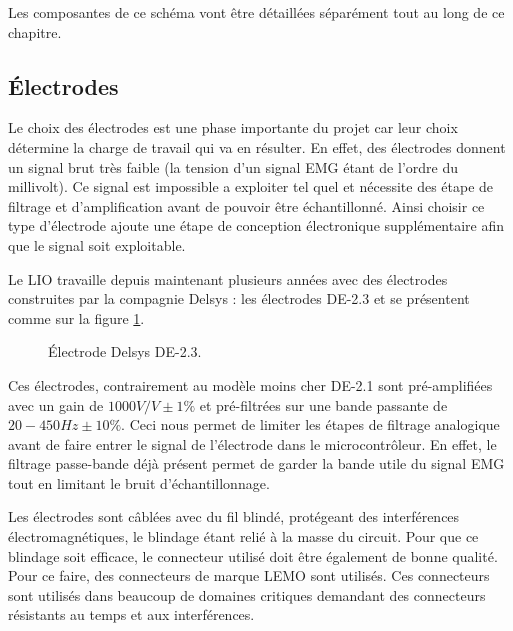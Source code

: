 \documentclass[letterpaper, twoside, 12pt, memoire, creativecommons, hyperref]{thETS}
\begin{document}
Les composantes de ce schéma vont être détaillées séparément tout au long de ce chapitre.

\subsection{Électrodes}

Le choix des électrodes est une phase importante du projet car leur choix détermine la charge de travail qui va en résulter. En effet, des électrodes donnent un signal brut très faible (la tension d'un signal EMG étant de l'ordre du millivolt). Ce signal est impossible a exploiter tel quel et nécessite des étape de filtrage et d'amplification avant de pouvoir être échantillonné. Ainsi choisir ce type d'électrode ajoute une étape de conception électronique supplémentaire afin que le signal soit exploitable.

Le LIO travaille depuis maintenant plusieurs années avec des électrodes construites par la compagnie Delsys : les électrodes DE-2.3 et se présentent comme sur la figure \ref{fig:de2.3}. 

\begin{figure}
	\centering
	\caption{Électrode Delsys DE-2.3.}
	\label{fig:de2.3}
\end{figure}

Ces électrodes, contrairement au modèle moins cher DE-2.1 sont pré-amplifiées avec un gain de $1000 V/V \pm 1\%$ et pré-filtrées sur une bande passante de $20-450 Hz \pm 10\%$. Ceci nous permet de limiter les étapes de filtrage analogique avant de faire entrer le signal de l'électrode dans le microcontrôleur. En effet, le filtrage passe-bande déjà présent permet de garder la bande utile du signal EMG tout en limitant le bruit d'échantillonnage.

Les électrodes sont câblées avec du fil blindé, protégeant des interférences électromagnétiques, le blindage étant relié à la masse du circuit. Pour que ce blindage soit efficace, le connecteur utilisé doit être également de bonne qualité. Pour ce faire, des connecteurs de marque LEMO sont utilisés. Ces connecteurs sont utilisés dans beaucoup de domaines critiques demandant des connecteurs résistants au temps et aux interférences. 
\end{document}
